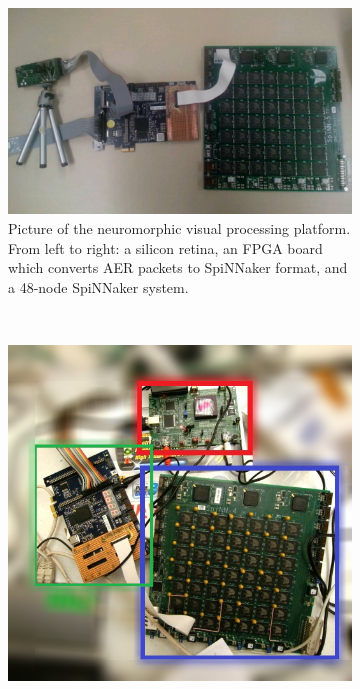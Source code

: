 	\begin{figure}[tbp!]
	\centering
	\begin{subfigure}[t]{0.8\textwidth}
		\includegraphics[width=\textwidth]{pics_snn/outline2.jpg}
		\caption{Picture of the neuromorphic visual processing platform. From left to right: a silicon retina, an FPGA board which converts AER packets to SpiNNaker format, and a 48-node SpiNNaker system.}
	\end{subfigure}\\
	\begin{subfigure}[t]{0.528\textwidth}
		\includegraphics[width=\textwidth]{pics_snn/photooutline_blurred.jpg}

\end{subfigure}
\end{figure}
